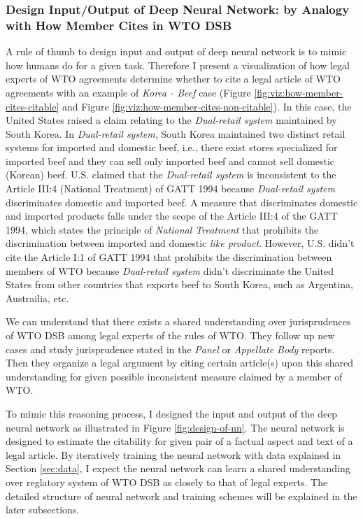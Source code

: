 \documentclass[12pt,letterpaper]{article}
\begin{document}
\subsubsection{Design Input/Output of Deep Neural Network: by Analogy with How Member Cites in WTO DSB} \label{design:io}
A rule of thumb to design input and output of deep neural network is to mimic
how humans do for a given task.
Therefore I present a visualization of how legal experts of WTO agreements determine whether to cite a legal article of WTO agreements with an example of \textit{Korea - Beef} case (Figure \ref{fig:viz:how-member-cites-citable} and Figure \ref{fig:viz:how-member-cites-non-citable}).
In this case, the United States raised a claim relating to the \textit{Dual-retail system} maintained by South Korea. In \textit{Dual-retail system}, South Korea maintained two distinct retail systems
for imported and domestic beef, i.e., there exist stores specialized for imported beef and they can sell only imported beef and cannot sell domestic (Korean) beef. U.S. claimed that the \textit{Dual-retail system} is inconsistent to the Article III:4 (National Treatment) of GATT 1994
because \textit{Dual-retail system} discriminates domestic and imported beef. A measure that discriminates domestic and imported products falls under the scope of the Article III:4 of the GATT 1994, which states the principle of \textit{National Treatment} that prohibits the discrimination between imported and domestic \textit{like product}. However, U.S. didn't
cite the Article I:1 of GATT 1994 that prohibits the discrimination between members of WTO
because \textit{Dual-retail system} didn't discriminate the United States from other countries that exports beef to South Korea, such as Argentina, Austrailia, etc.

We can understand that there exists a shared understanding over jurisprudences of WTO DSB among legal experts of the rules of WTO. They follow up new cases and study jurisprudence stated in the \textit{Panel} or  \textit{Appellate Body} reports.
Then they organize a legal argument by citing certain article(s) upon this shared understanding for given possible inconsistent measure claimed by a member of WTO.

To mimic this reasoning process, I designed the input and output of the deep neural network as illustrated in Figure \ref{fig:design-of-nn}.
The neural network is designed to estimate the citability for given pair of a factual aspect and text of a legal article.
By iteratively training the neural network with data explained in Section \ref{sec:data}, I expect the neural network can learn a shared understanding over reglatory system of WTO DSB as closely to that of legal experts.
The detailed structure of neural network and training schemes will be explained in the later subsections.
\clearpage

\end{document}
